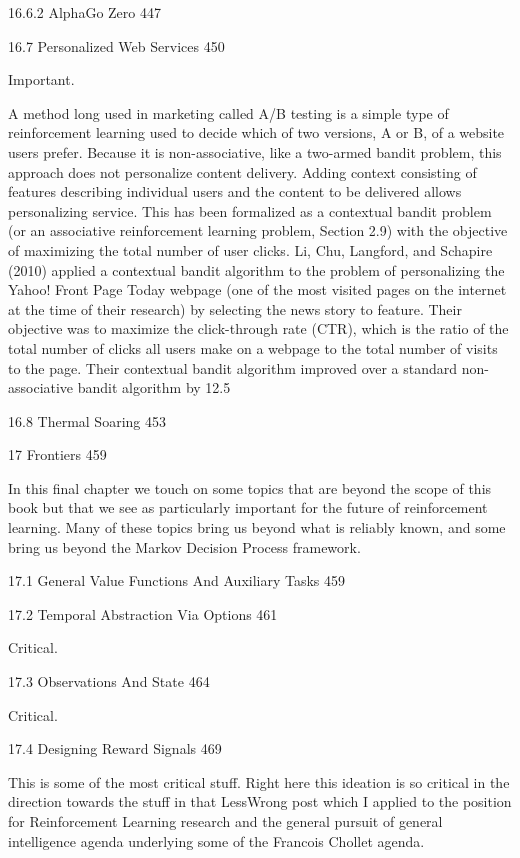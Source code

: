 16.6.2 AlphaGo Zero 447



16.7 Personalized Web Services 450

Important.

A method long used in marketing called A/B testing is a simple type of reinforcement learning used to decide which of two versions, A or B, of a website users prefer. Because it is non-associative, like a two-armed bandit problem, this approach does not personalize content delivery. Adding context consisting of features describing individual users and the content to be delivered allows personalizing service. This has been formalized as a contextual bandit problem (or an associative reinforcement learning problem, Section 2.9) with the objective of maximizing the total number of user clicks. Li, Chu, Langford, and Schapire (2010) applied a contextual bandit algorithm to the problem of personalizing the Yahoo! Front Page Today webpage (one of the most visited pages on the internet at the time of their research) by selecting the news story to feature. Their objective was to maximize the click-through rate (CTR), which is the ratio of the total number of clicks all users make on a webpage to the total number of visits to the page. Their contextual bandit algorithm improved over a standard non-associative bandit algorithm by 12.5%

16.8 Thermal Soaring 453



17 Frontiers 459

In this final chapter we touch on some topics that are beyond the scope of this book but that we see as particularly important for the future of reinforcement learning. Many of these topics bring us beyond what is reliably known, and some bring us beyond the Markov Decision Process framework.

17.1 General Value Functions And Auxiliary Tasks 459



17.2 Temporal Abstraction Via Options 461

Critical.

17.3 Observations And State 464

Critical.

17.4 Designing Reward Signals 469

This is some of the most critical stuff. Right here this ideation is so critical in the direction towards the stuff in that LessWrong post which I applied to the position for Reinforcement Learning research and the general pursuit of general intelligence agenda underlying some of the Francois Chollet agenda.

